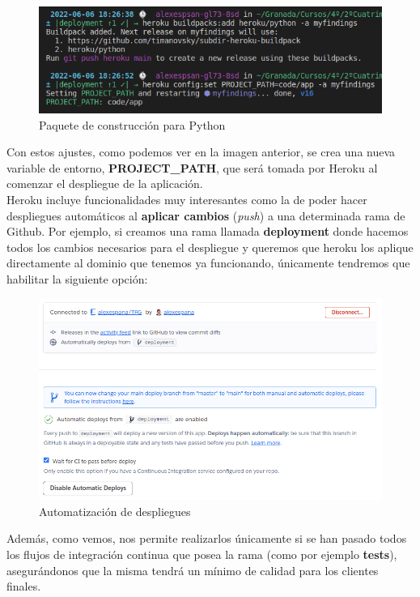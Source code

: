     \begin{figure}[H]
        \centering
        \includegraphics[scale=0.55]{imagenes/second-buildpack.png}
        \caption{Paquete de construcción para Python}
        \label{fig:heroku-buildpack-python}
    \end{figure}

Con estos ajustes, como podemos ver en la imagen anterior, se crea una nueva variable de
entorno, \textbf{PROJECT\_PATH}, que será tomada por Heroku al comenzar el despliegue de
la aplicación.\\

Heroku incluye funcionalidades muy interesantes como la de poder hacer despliegues
automáticos al \textbf{aplicar cambios} (\textit{push}) a una determinada rama de Github.
Por ejemplo, si creamos una rama llamada \textbf{deployment} donde hacemos todos los
cambios necesarios para el despliegue y queremos que heroku los aplique directamente al
dominio que tenemos ya funcionando, únicamente tendremos que habilitar la siguiente opción:

    \begin{figure}[H]
        \centering
        \includegraphics[scale=0.44]{imagenes/autodeploy.png}
        \caption{Automatización de despliegues}
        \label{fig:autodeploy}
    \end{figure}

Además, como vemos, nos permite realizarlos únicamente si se han pasado todos los flujos
de integración continua que posea la rama (como por ejemplo \textbf{tests}), asegurándonos
que la misma tendrá un mínimo de calidad para los clientes finales.\\

